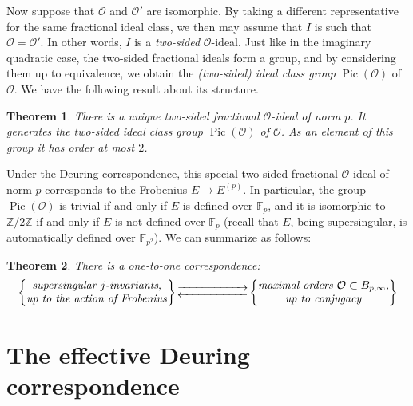 \documentclass[10pt]{article}
\theoremstyle{plain}
\newtheorem{theorem}{Theorem}
\theoremstyle{definition}
\DeclareMathOperator{\Pic}{Pic} %
\def\F{\ensuremath{\mathbb{F}}}
\def\Z{\ensuremath{\mathbb{Z}}}
\def\O{\ensuremath{\mathcal{O}}}
\begin{document}
Now suppose that $\O$ and $\O'$ are isomorphic. By taking a different
representative for the same fractional ideal class,
we then may assume that $I$ is such that $\O=\O'$.
In other words, $I$ is a \emph{two-sided}
$\O$-ideal. Just like in the imaginary quadratic case, the
two-sided fractional ideals form a group, and by considering them up to
equivalence, we obtain the \emph{(two-sided) ideal class group}
$\Pic(\O)$ of $\O$.
We have the following result about its structure.
\begin{theorem}
There is a unique two-sided fractional $\O$-ideal of norm $p$.
It generates the two-sided ideal class group $\Pic(\O)$ of $\O$.
As an element of this group it has order at most $2$.
\end{theorem}
Under the Deuring correspondence, this special two-sided fractional
$\O$-ideal of norm $p$
corresponds to the Frobenius $E\to E^{(p)}$.
In particular, the group $\Pic(\O)$ is trivial if and only if $E$ is
defined over $\F_p$, and it is isomorphic to $\Z/2\Z$ if and only if
$E$ is not defined over $\F_p$ (recall that $E$, being supersingular,
is automatically defined over $\F_{p^2}$).
We can summarize as follows:
\begin{theorem}
There is a one-to-one correspondence:
    \begin{equation*}
        \left\{
            \begin{tabular}{@{} c @{}}
                \emph{supersingular $j$-invariants}, \\
                \emph{up to the action of Frobenius}
            \end{tabular}
        \right\}
        \begin{gathered}
            \overset{}{\xrightarrow{\hspace*{2cm}}} \\[-2ex]
            \underset{}{\xleftarrow{\hspace*{2cm}}}
        \end{gathered}
        \left\{
            \begin{tabular}{@{} c @{}}
                \emph{maximal orders $\O\subset B_{p,\infty}$}, \\
                \emph{up to conjugacy}
            \end{tabular}
        \right\}
    \end{equation*}
\end{theorem}


\section{The effective Deuring correspondence}
\label{sec:eff-deuring}
\end{document}
